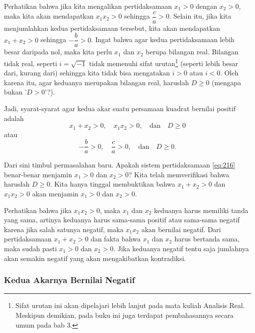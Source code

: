 		\par Perhatikan bahwa jika kita mengalikan pertidaksamaan $ x_{1} > 0 $ dengan $ x_{2} > 0 $, maka kita akan mendapatkan $ x_{1}x_{2} > 0 $ sehingga $ \dfrac{c}{a} > 0 $. Selain itu, jika kita menjumlahkan kedua pertidaksamaan tersebut, kita akan mendapatkan $ x_{1} + x_{2} > 0 $ sehingga $ -\dfrac{b}{a} > 0 $. Ingat bahwa agar kedua pertidaksamaan lebih besar daripada nol, maka kita perlu $ x_{1} $ dan $ x_{2} $ berupa bilangan real. Bilangan tidak real, seperti $ i = \sqrt{-1} $ tidak memenuhi sifat urutan\footnote{Sifat urutan ini akan dipelajari lebih lanjut pada mata kuliah Analisis Real. Meskipun demikian, pada buku ini juga terdapat pembahasannya secara umum pada bab 3.} (seperti lebih besar dari, kurang dari) sehingga kita tidak bisa mengatakan $ i > 0 $ atau $ i < 0 $. Oleh karena itu, agar keduanya merupakan bilangan real, haruslah $ D \geq 0 $ (mengapa bukan '$ D > 0 $'?).
		
		\par Jadi, syarat-syarat agar kedua akar suatu persamaan kuadrat bernilai positif adalah
		\begin{equation} \label{eq:216}
			x_{1} + x_{2} > 0, \quad x_{1}x_{2} > 0, \quad \mbox{dan} \quad D \geq 0
		\end{equation}
		atau
		\[ -\frac{b}{a} > 0, \quad \frac{c}{a} > 0, \quad \mbox{dan} \quad D \geq 0. \]
		
		\par Dari sini timbul permasalahan baru. Apakah sistem pertidaksamaan \ref{eq:216} benar-benar menjamin $ x_{1} > 0 $ dan $ x_{2} > 0 $? Kita telah memverifikasi bahwa haruslah $ D \geq 0 $. Kita hanya tinggal membuktikan bahwa $ x_{1} + x_{2} > 0 $ dan $ x_{1}x_{2} > 0 $ akan menjamin $ x_{1} > 0 $ dan $ x_{2} > 0 $.
		
		\par Perhatikan bahwa jika $ x_{1}x_{2} > 0 $, maka $ x_{1} $ dan $ x_{2} $ keduanya harus memiliki tanda yang sama, artinya keduanya harus sama-sama positif atau sama-sama negatif karena jika salah satunya negatif, maka $ x_{1}x_{2} $ akan bernilai negatif. Dari pertidaksamaan $ x_{1} + x_{2} > 0 $ dan fakta bahwa $ x_{1} $ dan $ x_{2} $ harus bertanda sama, maka sudah pasti $ x_{1} > 0 $ dan $ x_{2} > 0 $. Jika keduanya negatif tentu saja jumlahnya akan semakin negatif yang akan mengakibatkan kontradiksi.
	
	\subsubsection{Kedua Akarnya Bernilai Negatif}
		
